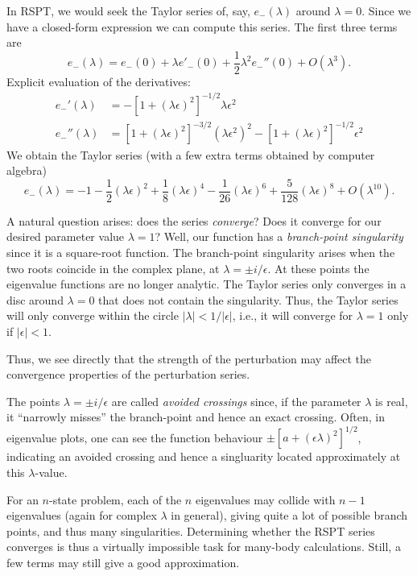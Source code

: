 \documentclass{report}
\theoremstyle{plain}
\theoremstyle{definition}
\begin{document}
In RSPT, we would seek the Taylor series of, say, $e_-(\lambda)$
around $\lambda=0$. Since we have a closed-form expression we can
compute this series. The first three terms are
\begin{equation}
  e_-(\lambda) = e_-(0) + \lambda e'_-(0) + \frac{1}{2}\lambda^2 e_-''(0)
  + O(\lambda^3).
\end{equation}
Explicit evaluation of the derivatives:
\begin{align}
  e_-'(\lambda) &= -[1 + (\lambda\epsilon)^2]^{-1/2} \lambda\epsilon^2 \\
  e_-''(\lambda) &= [1 + (\lambda\epsilon)^2]^{-3/2}
  (\lambda\epsilon^2)^2 - [1 + (\lambda\epsilon)^2]^{-1/2} \epsilon^2
\end{align}
We obtain the Taylor series (with a few extra terms obtained by
computer algebra)
\begin{equation}
  e_-(\lambda) = -1 - \frac{1}{2}(\lambda\epsilon)^2 +
  \frac{1}{8}(\lambda\epsilon)^4 - \frac{1}{26}(\lambda\epsilon)^6  +
  \frac{5}{128} (\lambda\epsilon)^8 + O(\lambda^{10}). \label{eq:twostate-taylor}
\end{equation}

A natural question arises: does the series \emph{converge}? Does it
converge for our desired parameter value $\lambda=1$? Well, our
function has a \emph{branch-point singularity} since it is a
square-root function.  The branch-point singularity arises when the
two roots coincide in the complex plane, at $\lambda = \pm
i/\epsilon$. At these points the eigenvalue functions are no longer
analytic. The Taylor series only converges in a disc around
$\lambda=0$ that does not contain the singularity. Thus, the Taylor
series will only converge within the circle $|\lambda|<1/|\epsilon|$,
i.e., it will converge for $\lambda=1$ only if $|\epsilon| < 1$.

Thus, we see directly that the strength of the perturbation may affect
the convergence properties of the perturbation series.

The points $\lambda = \pm i/\epsilon$ are called \emph{avoided
  crossings} since, if the parameter $\lambda$ is real, it ``narrowly
misses'' the branch-point and hence an exact crossing. Often, in
eigenvalue plots, one can see the function behaviour $\pm [a+(\epsilon
\lambda)^2]^{1/2}$, indicating an avoided crossing and hence a
singluarity located approximately at this $\lambda$-value.

For an $n$-state problem, each of the $n$ eigenvalues may collide with
$n-1$ eigenvalues (again for complex $\lambda$ in general), giving
quite a lot of possible branch points, and thus many
singularities. Determining whether the RSPT series converges is thus
a virtually impossible task for many-body calculations. Still, a few
terms may still give a good approximation.
\end{document}

